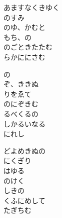 \documentclass[10pt,b5j]{tarticle} %
\begin{document}
\vspace{1.5em} %
\newcommand{\linespace}{0.5em} %
\newcommand{\blocksize}{0.5\hsize} %
\begin{enumerate} %
    \begin{minipage}[c]{\blocksize}
    
        \vspace{\linespace}
        \item
        あますなくきゆく\\
        のすみ\\
        のゆ、かむと\\
        もち、の\\
        のごときたたむ\\
        らかににさむ
        
        \vspace{\linespace}
        \item
        の\\
        ぞ、ききぬ\\
        りをゑて\\
        のにぞきむ\\
        るべくるの\\
        しかるいなる\\
        にれし
        
        \vspace{\linespace}
        \item
        どよめきぬの\\
        にくぎり\\
        はゆる\\
        のけく\\
        しきの\\
        くふにめして\\
        たぎちむ
        

\end{minipage}
\end{enumerate}
\end{document}
